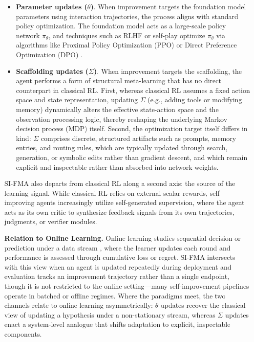\begin{itemize}
\item \textbf{Parameter updates ($\theta$)}.
When improvement targets the foundation model parameters using interaction trajectories, the process aligns with standard policy optimization. The foundation model acts as a large-scale policy network $\pi_{\theta}$, and techniques such as RLHF \citep{christiano2017deep, ouyang2022training} or self-play optimize $\pi_{\theta}$ via algorithms like Proximal Policy Optimization (PPO) \citep{schulman2017proximal} or Direct Preference Optimization (DPO) \citep{rafailov2023direct}.

\item \textbf{Scaffolding updates ($\Sigma$)}.
When improvement targets the scaffolding, the agent performs a form of structural meta-learning that has no direct counterpart in classical RL. First, whereas classical RL assumes a fixed action space and state representation, updating $\Sigma$ (e.g., adding tools or modifying memory) dynamically alters the effective state-action space and the observation processing logic, thereby reshaping the underlying Markov decision process (MDP) itself. Second, the optimization target itself differs in kind: $\Sigma$ comprises discrete, structured artifacts such as prompts, memory entries, and routing rules, which are typically updated through search, generation, or symbolic edits rather than gradient descent, and which remain explicit and inspectable rather than absorbed into network weights.
\end{itemize}

SI-FMA also departs from classical RL along a second axis: the source of the learning signal. While classical RL relies on external scalar rewards, self-improving agents increasingly utilize self-generated supervision, where the agent acts as its own critic to synthesize feedback signals from its own trajectories, judgments, or verifier modules.


\textbf{Relation to Online Learning.}
Online learning \citep{littlestone1988learning, hoi2021online} studies sequential decision or prediction under a data stream \citep{qi2025webrl}, where the learner updates each round and performance is assessed through cumulative loss or regret. SI-FMA intersects with this view when an agent is updated repeatedly during deployment and evaluation tracks an improvement trajectory rather than a single endpoint, though it is not restricted to the online setting—many self-improvement pipelines operate in batched or offline regimes. Where the paradigms meet, the two channels relate to online learning asymmetrically: $\theta$ updates recover the classical view of updating a hypothesis under a non-stationary stream, whereas $\Sigma$ updates enact a system-level analogue that shifts adaptation to explicit, inspectable components.

